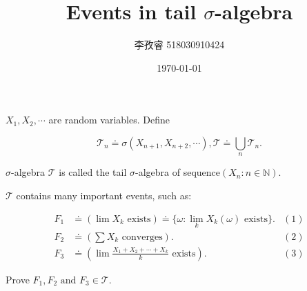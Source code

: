 \documentclass{article}
\title{Events in tail $\sigma$-algebra}
\author{李孜睿 518030910424}
\date{\today}
\begin{document}
	\maketitle
	$X_1,X_2,\cdots$ are random variables. Define
	
	$$
	\mathcal{T}_n\doteq\sigma(X_{n+1},X_{n+2},\cdots),\mathcal{T}\doteq\bigcup_n\mathcal{T}_n.
	$$
	
	$\sigma$-algebra $\mathcal{T}$ is called the tail $\sigma$-algebra of sequence$(X_n:n\in\mathbb{N})$.
	
	$\mathcal{T}$ contains many important events, such as:
	
	$$
	\begin{aligned}
		F_1&\doteq(\lim X_k\text{ exists})\doteq\{\omega:\lim_kX_k(\omega)\text{ exists}\}.&(1)\\
		F_2&\doteq\left(\sum X_k \text{ converges}\right).&(2)\\
		F_3&\doteq\left(\lim\frac{X_1+X_2+\cdots+X_k}{k}\text{ exists}\right).&(3)
	\end{aligned}
	$$
	
	Prove $F_1,F_2\text{ and }F_3\in\mathcal{T}$.
	
\end{document}
